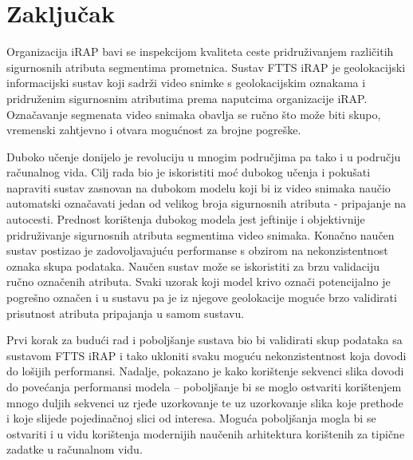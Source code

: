\documentclass[times, utf8, diplomski, numeric]{fer}
\begin{document}
\chapter{Zaključak}
Organizacija iRAP bavi se inspekcijom kvaliteta ceste pridruživanjem različitih sigurnosnih atributa segmentima prometnica. 
Sustav FTTS iRAP je geolokacijski informacijski sustav koji sadrži video snimke s geolokacijskim oznakama i pridruženim sigurnosnim atributima prema naputcima organizacije iRAP. 
Označavanje segmenata video snimaka obavlja se ručno što može biti skupo, vremenski zahtjevno i otvara mogućnost za brojne pogreške. 

Duboko učenje donijelo je revoluciju u mnogim područjima pa tako i u području računalnog vida. 
Cilj rada bio je iskoristiti moć dubokog učenja i pokušati napraviti sustav zasnovan na dubokom modelu koji bi iz video snimaka naučio automatski označavati jedan od velikog broja sigurnosnih atributa - pripajanje na autocesti. 
Prednost korištenja dubokog modela jest jeftinije i objektivnije pridruživanje sigurnosnih atributa segmentima video snimaka. 
Konačno naučen sustav postizao je zadovoljavajuću performanse s obzirom na nekonzistentnost oznaka skupa podataka. 
Naučen sustav može se iskoristiti za brzu validaciju ručno označenih atributa. 
Svaki uzorak koji model krivo označi potencijalno je pogrešno označen i u sustavu pa je iz njegove geolokacije moguće brzo validirati prisutnost atributa pripajanja u samom sustavu.

Prvi korak za budući rad i poboljšanje sustava bio bi validirati skup podataka sa sustavom FTTS iRAP i tako ukloniti svaku moguću nekonzistentnost koja dovodi do lošijih performansi. 
Nadalje, pokazano je kako korištenje sekvenci slika dovodi do povećanja performansi modela -- poboljšanje bi se moglo ostvariti korištenjem mnogo duljih sekvenci uz rjeđe uzorkovanje te uz uzorkovanje slika koje prethode i koje slijede pojedinačnoj slici od interesa. 
Moguća poboljšanja mogla bi se ostvariti i u vidu korištenja modernijih naučenih arhitektura korištenih za tipične zadatke u računalnom vidu.



\end{document}
